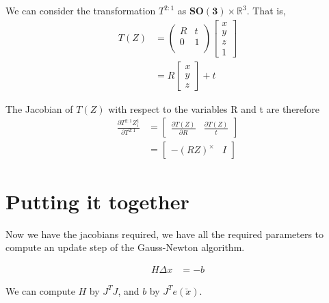 \documentclass[twoside]{article}
\begin{document}
We can consider the transformation $T^{2:1}$ as $\mathbf{SO(3)} \times \mathbb{R}^3$. That is,
\begin{equation}
\begin{split}
T(Z) &= 
\begin{pmatrix}
R & t \\
0 & 1\\
\end{pmatrix}
\begin{bmatrix}
x \\ y \\ z \\ 1
\end{bmatrix} \\
&= R
\begin{bmatrix}
x \\ y \\ z
\end{bmatrix}
+ t
\end{split}
\end{equation}

The Jacobian of $T(Z)$ with respect to the variables R and t are therefore
\begin{equation}
\begin{split}
\frac{\partial T^{2:1} Z_i^1}{\partial T^{2:1}} &= 
\begin{bmatrix}
\frac{\partial T(Z)}{\partial R} & \frac{\partial T(Z)}{t}
\end{bmatrix} \\
&= 
\begin{bmatrix}
- (RZ)^\times & I
\end{bmatrix}
\end{split}
\end{equation}

\section{Putting it together}

Now we have the jacobians required, we have all the required parameters to compute an update step of the Gauss-Newton algorithm.

\begin{equation}
\begin{split}
H \Delta x &= -b
\end{split}
\end{equation}

We can compute $H$ by $J^T J$, and $b$ by $J^Te(\breve{x})$.
\end{document}
